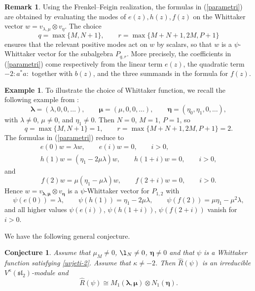 \documentclass[pdftex]{sigma}
\numberwithin{equation}{section}
\newtheorem{Conjecture}[Theorem]{Conjecture}
\theoremstyle{definition}
\newtheorem{Example}[Theorem]{Example}
\newtheorem{Remark}[Theorem]{Remark}
\newcommand{\1}{\textbf{1}}
\begin{document}
 \begin{Remark}
 Using the Frenkel--Feigin realization, the formulas in (\ref{parametri})
are obtained by evaluating the modes of
$
e(z), h(z),
f(z)
$
on the Whittaker vector $w=v_{\lambda,\mu}\otimes v_\eta$.
The choice
\[
q=\max\{M,N+1\}, \qquad r=\max\{M+N+1,2M,P+1\}
\]
ensures that the relevant positive modes act on $w$ by scalars, so that $w$ is a
$\psi$-Whittaker vector for the subalgebra $P_{q,r}$.
More precisely, the coefficients in (\ref{parametri}) come respectively from the linear
term $e(z)$, the quadratic term $-2{:}a^*a{:}$ together with $b(z)$, and the three
summands in the formula for $f(z)$.
 \end{Remark}

\begin{Example} To illustrate the choice of Whittaker function, we recall the following example from \cite[Section~9]{ALZ-16}:
\[
\bm{\lambda}=(\lambda,0,0,\dots), \qquad
\bm{\mu}=(\mu,0,0,\dots), \qquad
\bm{\eta}=(\eta_0,\eta_1,0,\dots),
\]
with $\lambda\neq 0$, $\mu\neq 0$, and $\eta_1\neq 0$. Then
$N=0$, $M=1$, $P=1$,
so
\[
q=\max\{M,N+1\}=1,\qquad r=\max\{M+N+1,2M,P+1\}=2.
\]
The formulas in (\ref{parametri}) reduce to
\begin{gather*}
e(0)w=\lambda w,\qquad e(i)w=0, \qquad i>0,
\\
h(1)w=(\eta_1-2\mu\lambda)w,\qquad h(1+i)w=0, \qquad i>0,
\end{gather*}
and
\[
f(2)w=\mu (\eta_1-\mu \lambda)w,\qquad f(2+i)w=0, \qquad i>0.
\]
Hence $w=v_{\bm{\lambda},\bm{\mu}}\otimes v_{\bm{\eta}}$ is a $\psi$-Whittaker vector for $P_{1,2}$ with
\[
\psi(e(0))=\lambda,\qquad
\psi(h(1))=\eta_1-2\mu\lambda,\qquad
\psi(f(2))=\mu\eta_1-\mu^2\lambda,
\]
and all higher values $\psi(e(i))$, $\psi(h(1+i))$, $\psi(f(2+i))$ vanish for $i>0$.
\end{Example}

 We have the following general conjecture.
 \begin{Conjecture} \label{conj7.3} Assume that $\mu_M\ne 0$, ${\l}_N \ne 0$, $\bm{\eta} \ne 0$ and that $\psi$ is a Whittaker function satisfying \eqref{uvjeti-2}.
 Assume that $\kappa \ne -2$. Then
 $\widehat{R}(\psi)$ is an irreducible $V^{\kappa} (\mathfrak{sl}_2)$-module and
 \[ \widehat{R}(\psi) \cong M_1 (\bm{\lambda}, \bm{\mu}) \otimes N_1 (\bm{\eta}). \]
 \end{Conjecture}
\end{document}
